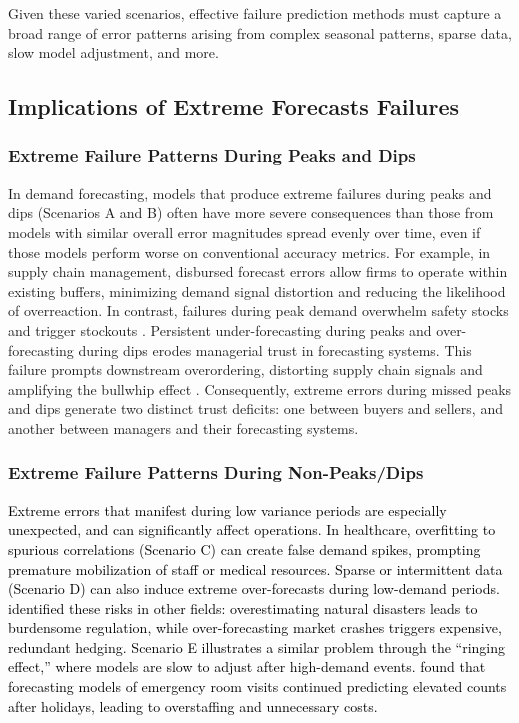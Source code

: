\documentclass[]{interact}
\theoremstyle{plain}
\theoremstyle{definition}
\theoremstyle{remark}
\newcommand{\matt}[1]{\textcolor{black}{#1}}
\begin{document}
Given these varied scenarios, effective failure prediction methods must capture a broad range
of error patterns arising from complex seasonal patterns, sparse data, slow model
adjustment, and more.

\subsection{Implications of Extreme Forecasts Failures}

\subsubsection{Extreme Failure Patterns During Peaks and Dips}

In demand forecasting, models that produce extreme failures during peaks and dips (Scenarios
A and B) often have more severe consequences than those from models with similar overall
error magnitudes spread evenly over time, even if those models perform worse on conventional
accuracy metrics. For example, in supply chain management, disbursed forecast errors allow
firms to operate within existing buffers, minimizing demand signal distortion and reducing
the likelihood of overreaction. In contrast, failures during peak demand overwhelm safety
stocks and trigger stockouts \citep{bray2019}. Persistent under-forecasting during peaks and
over-forecasting during dips erodes managerial trust in forecasting systems. This failure
prompts downstream overordering, distorting supply chain signals and amplifying the bullwhip
effect \citep{croson2014, wu2006}. Consequently, extreme errors during missed peaks and dips
generate two distinct trust deficits: one between buyers and sellers, and another between
managers and their forecasting systems.

\subsubsection{Extreme Failure Patterns During Non-Peaks/Dips}

\matt{Extreme errors that manifest during low variance periods are especially unexpected,
and can significantly affect operations. In healthcare, overfitting to spurious correlations
(Scenario C) can create false demand spikes, prompting premature mobilization of staff or
medical resources. Sparse or intermittent data (Scenario D) can also induce extreme
over-forecasts during low-demand periods. \citet{nikolopoulos2021} identified these risks in
other fields: overestimating natural disasters leads to burdensome regulation, while
over-forecasting market crashes triggers expensive, redundant hedging. Scenario E illustrates
a similar problem through the ``ringing effect,'' where models are slow to adjust after
high-demand events. \citet{Burkom2007} found that forecasting models of emergency room
visits continued predicting elevated counts after holidays, leading to overstaffing and
unnecessary costs.}
\end{document}

